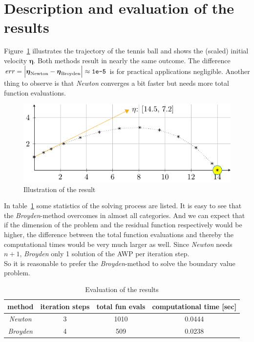 \documentclass[11pt,a4paper,oneside]{scrartcl}
\begin{document}
\section{Description and evaluation of the results}

Figure~\ref{fig:result} illustrates the trajectory of the tennis ball and shows the (scaled) initial velocity $\boldsymbol{\eta}$.
Both methods result in nearly the same outcome. The difference $err = \Big| \boldsymbol{\eta}_{\textnormal{Newton}} - \boldsymbol{\eta}_{\textnormal{Broyden}} \Big| \approx \texttt{1e-5}$  is for practical applications negligible. Another thing to observe is that \textit{Newton} converges a bit faster but needs more total function evaluations.


\begin{figure}[hb]
\centering
\includegraphics[scale=1]{Solution_x14_y.pdf}
\caption{Illustration of the result}
\label{fig:result}
\end{figure}

In table~\ref{tab:eva:results} some statistics of the solving process are listed. It is easy to see that the \textit{Broyden}-method overcomes in almost all categories. And we can expect that if the dimension of the problem and the residual function respectively would be higher, the difference between the total function evaluations and thereby the computational times would be very much larger as well. Since \textit{Newton} needs $n+1$, \textit{Broyden} only 1 solution of the AWP per iteration step.\\
So it is reasonable to prefer the \textit{Broyden}-method to solve the boundary value problem.



\begin{table}[b]
\begin{center}
\begin{tabular}{c|ccc}
method & iteration steps & total fun evals & computational time [sec]\\
\hline
\textit{Newton} & 3 & 1010 & 0.0444 \\
\textit{Broyden} & 4 & 509 & 0.0238 \\

\end{tabular}
\end{center}
\caption{Evaluation of the results}
\label{tab:eva:results}
\end{table}
\end{document}
